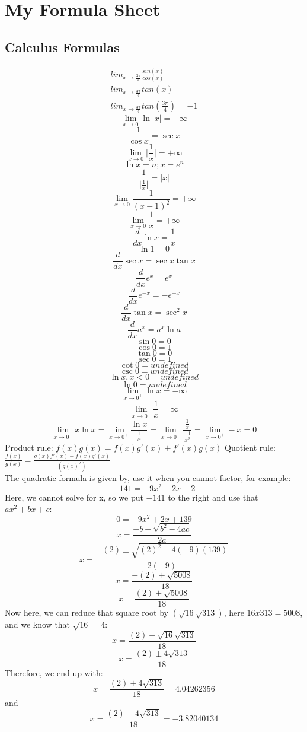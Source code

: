 \documentclass{article}
\begin{document}
\section*{My Formula Sheet}

\subsection*{Calculus Formulas}
\begin{align}
   lim_{x \to \frac{3\pi}{4}} \frac{sin(x)}{cos(x)}\\
   lim_{x \to \frac{3\pi}{4}} tan(x)\\
   lim_{x \to \frac{3\pi}{4}} tan(\frac{3\pi}{4}) = -1
\end{align}
\[\lim_{x \to 0} \ln{ \lvert x \rvert} = -\infty \]
\[\frac{1}{\cos{x}} = \sec{x}\]
\[\lim_{x \to 0} \lvert \frac{1}{x} \rvert = +\infty \] 
\[\ln{x}=n; x = e^{n}\]
\[\frac{1}{\lvert \frac{1}{x} \rvert} = \lvert x \rvert\]
\[\lim_{x \to 0}\frac{1}{(x-1)^2}=+\infty\]
\[\lim_{x \to 0}\frac{1}{x}=+\infty\]
\[\frac{d}{dx} \ln{x} = \frac{1}{x}\]
\[\ln{1} = 0\]
\[\frac{d}{dx} \sec{x} = \sec{x} \tan{x}\]
\[\frac{d}{dx} e^x = e^x\]
\[\frac{d}{dx} e^{-x} = -e^{-x}\]
\[\frac{d}{dx} \tan{x} = \sec^2{x}\]
\[\frac{d}{dx} a^x = a^x \ln{a}\]
\[\sin{0} = 0\]
\[\cos{0} = 1\]
\[\tan{0} = 0\]
\[\sec{0} = 1\]
\[\cot{0} = undefined\]
\[\csc{0} = undefined\]
\[\ln{x}, x<0 = undefined\]
\[\ln{0} = undefined\]
\[\lim_{x \to 0^+} \ln{x} = -\infty\]
\[\lim_{x \to 0^+} \frac{1}{x} = \infty\]
\[\lim_{x \to 0^+} x \ln{x} = \lim_{x \to 0^+} \frac{\ln{x}}{\frac{1}{x}} = \lim_{x \to 0^+} \frac{\frac{1}{x}}{\frac{-1}{x^2}} = \lim_{x \to 0^+} -x = 0\]
Product rule: \(f(x)g(x) = f(x)g'(x)+f'(x)g(x)\)
Quotient rule: \(\frac{f(x)}{g(x)} = \frac{g(x)f'(x)-f(x)g'(x)}{(g(x)^2)}\)\\
\newline
The quadratic formula is given by, use it when you \underline{cannot factor}, for example:
\[-141 = -9x^2+2x-2\]
Here, we cannot solve for x, so we put \(-141\) to the right and use that \(ax^2+bx+c\):
\[0 = -9x^2+2x+139\]
\[ x = \frac{-b \pm \sqrt{b^2 - 4ac}}{2a} \]
\[ x = \frac{-(2) \pm \sqrt{(2)^2 - 4(-9)(139)}}{2(-9)} \]
\[ x = \frac{-(2) \pm \sqrt{5008}}{-18} \]
\[ x = \frac{(2) \pm \sqrt{5008}}{18} \]
Now here, we can reduce that square root by \((\sqrt{16} \sqrt{313})\), here \(16x313 = 5008\), and we know that \(\sqrt{16} = 4\):
\[ x = \frac{(2) \pm \sqrt{16} \sqrt{313}}{18} \]
\[ x = \frac{(2) \pm 4 \sqrt{313}}{18} \]
Therefore, we end up with:
\[ x = \frac{(2) + 4 \sqrt{313}}{18} = 4.04262356\]
and
\[ x = \frac{(2) - 4 \sqrt{313}}{18} = -3.82040134\]
\end{document}
